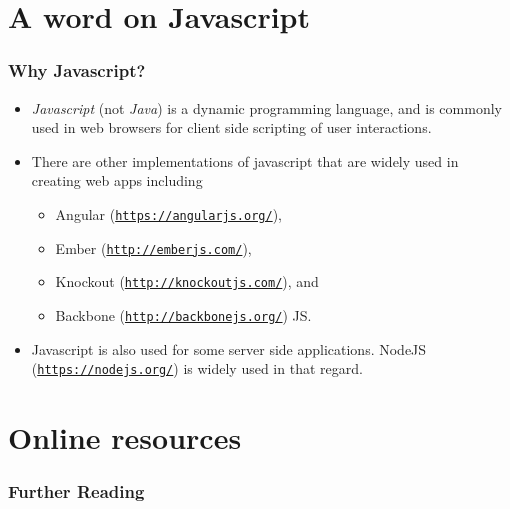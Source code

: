 \documentclass[10pt,t,xcolor=dvipsnames]{beamer}
\begin{document}
\section{A word on Javascript}
\begin{frame}[fragile]
\frametitle{Why Javascript?}
\begin{itemize}[<+->]
\item \textit{\alert{Javascript}} (not \textit{\alert{Java}}) is a dynamic programming language, and is commonly used in web browsers for client side scripting of user interactions.
\item There are other implementations of javascript that are widely used in creating web apps including
\begin{itemize}
\item Angular (\texttt{\href{angular_link}{https://angularjs.org/}}),
\item Ember (\texttt{\href{ember_link}{http://emberjs.com/}}),
\item Knockout (\texttt{\href{knockout_link}{http://knockoutjs.com/}}), and
\item Backbone (\texttt{\href{backbone_link}{http://backbonejs.org/}}) JS.
\end{itemize}
\item Javascript is also used for some server side applications. NodeJS (\texttt{\href{node_link}{https://nodejs.org/}}) is widely used in that regard.
\end{itemize}
\end{frame}
\section{Online resources}
\begin{frame}
\frametitle{Further Reading}
% 
% 
\end{frame}
\end{document}
